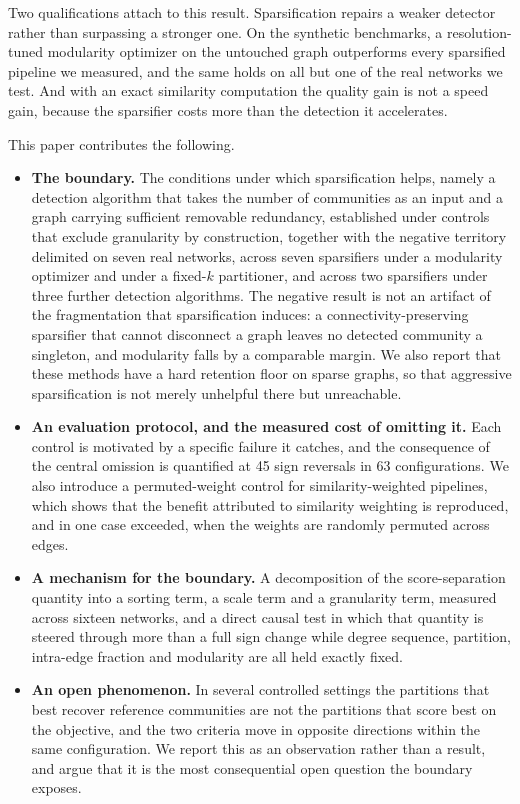 Two qualifications attach to this result. Sparsification repairs a weaker
detector rather than surpassing a stronger one. On the synthetic benchmarks, a
resolution-tuned modularity optimizer on the untouched graph outperforms every
sparsified pipeline we measured, and the same holds on all but one of the real
networks we test. And with an exact similarity computation the quality gain is
not a speed gain, because the sparsifier costs more than the detection it accelerates.

This paper contributes the following.

\begin{itemize}
  \item \textbf{The boundary.} The conditions under which sparsification helps,
  namely a detection algorithm that takes the number of communities as an input
  and a graph carrying sufficient removable redundancy, established under controls
  that exclude granularity by construction, together with the negative territory
  delimited on seven real networks, across seven sparsifiers under a modularity
  optimizer and under a fixed-$k$ partitioner, and across two sparsifiers under
  three further detection algorithms. The negative result is not an artifact of
  the fragmentation that sparsification induces: a connectivity-preserving
  sparsifier that cannot disconnect a graph leaves no detected community a
  singleton, and modularity falls by a comparable margin. We also report that
  these methods have a hard retention
  floor on sparse graphs, so that aggressive sparsification is not merely
  unhelpful there but unreachable.

  \item \textbf{An evaluation protocol, and the measured cost of omitting it.}
  Each control is motivated by a specific failure it catches, and the consequence
  of the central omission is quantified at 45 sign reversals in 63
  configurations. We also introduce a permuted-weight control for
  similarity-weighted pipelines, which shows that the benefit attributed to
  similarity weighting is reproduced, and in one case exceeded, when the weights
  are randomly permuted across edges.

  \item \textbf{A mechanism for the boundary.} A decomposition of the
  score-separation quantity into a sorting term, a scale term and a granularity
  term, measured across sixteen networks, and a direct causal test in which that
  quantity is steered
  through more than a full sign change while degree sequence, partition,
  intra-edge fraction and modularity are all held exactly fixed.

  \item \textbf{An open phenomenon.} In several controlled settings the
  partitions that best recover reference communities are not the partitions that
  score best on the objective, and the two criteria move in opposite directions
  within the same configuration. We report this as an observation rather than a
  result, and argue that it is the most consequential open question the boundary
  exposes.
\end{itemize}

